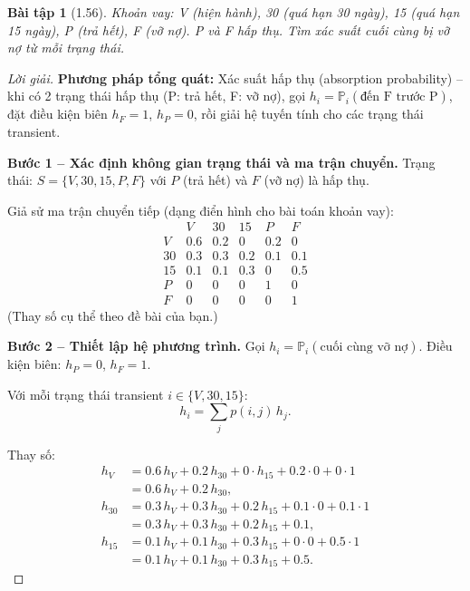 \documentclass[8pt,a4paper]{article}
\newtheorem{exercise}{Bài tập}
\newenvironment{solution}{\begin{proof}[Lời giải]}{\end{proof}}
\newcommand{\prob}{\mathbb{P}}
\begin{document}
\begin{exercise}[1.56]
Khoản vay: V (hiện hành), 30 (quá hạn 30 ngày), 15 (quá hạn 15 ngày), P (trả hết), F (vỡ nợ). P và F hấp thụ. Tìm xác suất cuối cùng bị vỡ nợ từ mỗi trạng thái.
\end{exercise}
\begin{solution}
\textbf{Phương pháp tổng quát:} Xác suất hấp thụ (absorption probability) -- khi có 2 trạng thái hấp thụ (P: trả hết, F: vỡ nợ), gọi $h_i = \prob_i(\text{đến F trước P})$, đặt điều kiện biên $h_F = 1$, $h_P = 0$, rồi giải hệ tuyến tính cho các trạng thái transient.

\textbf{Bước 1 -- Xác định không gian trạng thái và ma trận chuyển.}
Trạng thái: $S = \{V, 30, 15, P, F\}$ với $P$ (trả hết) và $F$ (vỡ nợ) là hấp thụ.

Giả sử ma trận chuyển tiếp (dạng điển hình cho bài toán khoản vay):
\[
\begin{array}{c|ccccc}
 & V & 30 & 15 & P & F \\ \hline
V & 0.6 & 0.2 & 0 & 0.2 & 0 \\
30 & 0.3 & 0.3 & 0.2 & 0.1 & 0.1 \\
15 & 0.1 & 0.1 & 0.3 & 0 & 0.5 \\
P & 0 & 0 & 0 & 1 & 0 \\
F & 0 & 0 & 0 & 0 & 1
\end{array}
\]
(Thay số cụ thể theo đề bài của bạn.)

\textbf{Bước 2 -- Thiết lập hệ phương trình.}
Gọi $h_i = \prob_i(\text{cuối cùng vỡ nợ})$. Điều kiện biên: $h_P = 0$, $h_F = 1$.

Với mỗi trạng thái transient $i \in \{V, 30, 15\}$:
\[
  h_i = \sum_{j} p(i,j)\, h_j.
\]

Thay số:
\begin{align*}
  h_V &= 0.6\, h_V + 0.2\, h_{30} + 0 \cdot h_{15} + 0.2 \cdot 0 + 0 \cdot 1 \\
      &= 0.6\, h_V + 0.2\, h_{30}, \\
  h_{30} &= 0.3\, h_V + 0.3\, h_{30} + 0.2\, h_{15} + 0.1 \cdot 0 + 0.1 \cdot 1 \\
      &= 0.3\, h_V + 0.3\, h_{30} + 0.2\, h_{15} + 0.1, \\
  h_{15} &= 0.1\, h_V + 0.1\, h_{30} + 0.3\, h_{15} + 0 \cdot 0 + 0.5 \cdot 1 \\
      &= 0.1\, h_V + 0.1\, h_{30} + 0.3\, h_{15} + 0.5.
\end{align*}


\end{solution}
\end{document}
